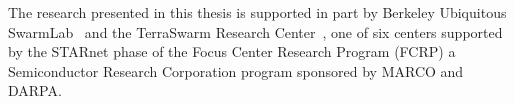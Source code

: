 \documentclass[thesis.tex]{subfiles}
\begin{document}
The research presented in this thesis is supported in part by Berkeley
Ubiquitous SwarmLab~\cite{swarmlab} and the TerraSwarm Research
Center~\cite{terraswarm}, one of six centers supported by the STARnet phase of
the Focus Center Research Program (FCRP) a Semiconductor Research Corporation
program sponsored by MARCO and DARPA.
\end{document}
